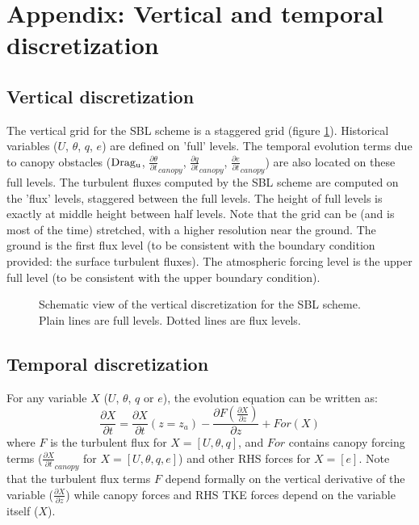 
\newpage
\section{\bf{Appendix}: Vertical and temporal discretization}

\subsection{Vertical discretization}

The vertical grid for the SBL scheme is a staggered grid (figure \ref{fig3}). Historical variables ($U$, $\theta$, $q$, $e$) are defined on 'full' levels. The temporal evolution terms due to canopy obstacles (${\rm Drag_u}$, $\frac{\partial \theta}{\partial t}_{canopy}$, $\frac{\partial q}{\partial t}_{canopy}$, $\frac{\partial e}{\partial t}_{canopy}$) are also located on these full levels. The turbulent fluxes computed by the SBL scheme are computed on the 'flux' levels, staggered between the full levels. The height of full levels is exactly at middle height between half levels. Note that the grid can be (and is most of the time) stretched, with a higher resolution near the ground. The ground is the first flux level (to be consistent with the boundary condition provided: the surface turbulent fluxes). The atmospheric forcing level is the upper full level (to be consistent with the upper boundary condition). \\

\begin{figure}[h]
\hspace*{2.cm}
\caption{Schematic view of the vertical discretization for the SBL scheme. Plain lines are full levels. Dotted lines are flux levels. \label{fig3}}
\end{figure}


\subsection{Temporal discretization}

For any variable $X$ ($U$, $\theta$, $q$ or $e$), the evolution equation can be written as:
\begin{equation}
\frac{\partial X}{\partial t} = \frac{\partial X}{\partial t}(z=z_a) - \frac{\partial F(\frac{\partial X}{\partial z})}{\partial z} + For(X)
\end{equation}
where $F$ is the turbulent flux for $X=[U,\theta,q]$, and $For$ contains  canopy forcing terms ($\frac{\partial X}{\partial t}_{canopy}$ for $X=[U,\theta,q,e]$) and other RHS forces for $X=[e]$. Note that the turbulent flux terms $F$ depend formally on the vertical derivative of the variable ($\frac{\partial X}{\partial z}$) while canopy forces and RHS TKE forces depend on the variable itself ($X$). \\


